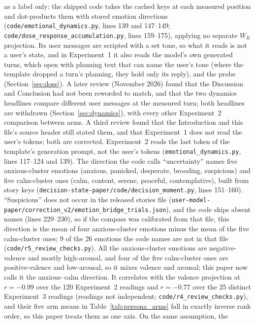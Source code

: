 \documentclass[11pt,a4paper]{article}
\begin{document}
as a label only: the shipped code takes the cached keys at each measured
position and dot-products them with stored emotion directions
(\texttt{code/emotional\_dynamics.py}, lines 139 and 147--149;
\texttt{code/dose\_response\_accumulation.py}, lines 159--175), applying
no separate $W_K$ projection. Its user messages are scripted with a set
tone, so what it reads is not a user's state, and in Experiment~1 it also
reads the model's own generated turns, which open with planning text that can name the user's tone (where the template dropped a turn's planning, they hold only its reply), and the probe (Section~\ref{sec:dose}). A later review (November 2026) found that the Discussion and
Conclusion had not been reworded to match, and that the two dynamics
headlines compare different user messages at the measured turn; both
headlines are withdrawn (Section~\ref{sec:dynamics}), with every other
Experiment~2 comparison between arms. A third review found that the
Introduction and this file's source header still stated them, and that
Experiment~1 does not read the user's tokens; both are corrected. Experiment~2 reads the last token of the template's generation prompt, not the user's tokens
(\texttt{emotional\_dynamics.py}, lines 117--124 and 139). The direction the code
calls ``uncertainty'' names five anxious-cluster emotions (anxious,
panicked, desperate, brooding, suspicious) and five calm-cluster ones
(calm, content, serene, peaceful, contemplative), built from story keys
(\texttt{decision-state-paper/\allowbreak code/\allowbreak decision\_moment.py}, lines
151--160). ``Suspicious'' does not occur in the released stories file
(\texttt{user-model-paper/\allowbreak correction\_v2/\allowbreak emotion\_bridge\_trials.json}),
and the code skips absent names (lines 229--230), so if the compass was
calibrated from that file, this direction is the mean of four
anxious-cluster emotions minus the mean of the five calm-cluster ones;
9 of the 26 emotions the code names are not in that file
(\texttt{code/r5\_review\_checks.py}). All the anxious-cluster emotions are negative-valence and
mostly high-arousal, and four of the five calm-cluster ones are
positive-valence and low-arousal, so it mixes valence and arousal; this
paper now calls it the anxious--calm direction. It correlates with the
valence projection at $r{=}-0.99$ over the 120 Experiment~2 readings and
$r{=}-0.77$ over the 25 distinct Experiment~3 readings (readings not
independent; \texttt{code/r4\_review\_checks.py}), and their five arm
means in Table~\ref{tab:persona_arms} fall in exactly inverse rank order,
so this paper treats them as one axis. On the same assumption, the
\end{document}
